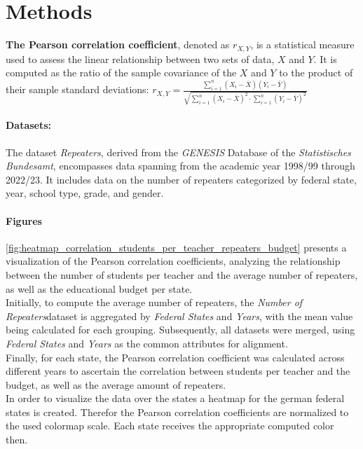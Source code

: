 \section*{Methods}


\textbf{The Pearson correlation coefficient}, denoted as $r_{X,Y}$, is a statistical measure used to assess the linear relationship between two sets of data, $X$ and $Y$. It is computed as the ratio of the sample covariance of the $X$ and $Y$ to the product of their sample standard deviations:
$r_{X,Y} = \frac{\sum_{i=1}^n (X_i - \overline{X}) (Y_i - \overline{Y})}{\sqrt{\sum_{i=1}^n(X_i-\overline{X})^2 \cdot \sum_{i=1}^n(Y_i-\overline{Y})^2}}$


\paragraph{Datasets:}
The dataset \textit{Repeaters}, derived from the \textit{GENESIS} Database of the \textit{Statistisches Bundesamt}, encompasses data spanning from the academic year 1998/99 through 2022/23.  It includes data on the number of repeaters categorized by federal state, year, school type, grade, and gender. 

\paragraph{Figures}
\autoref{fig:heatmap_correlation_students_per_teacher_repeaters_budget} presents a visualization of the Pearson correlation coefficients, analyzing the relationship between the number of students per teacher and the average number of repeaters, as well as the educational budget per state. 
\\
Initially, to compute the average number of repeaters, the \textit{Number of Repeaters}dataset is aggregated by \textit{Federal States} and \textit{Years}, with the mean value being calculated for each grouping. Subsequently, all datasets were merged, using \textit{Federal States} and \textit{Years} as the common attributes for alignment. 
\\
Finally, for each state, the Pearson correlation coefficient was calculated across different years to ascertain the correlation between students per teacher and the budget, as well as the average amount of repeaters.
\\
In order to visualize the data over the states a heatmap for the german federal states is created. Therefor the Pearson correlation coefficients are normalized to the used colormap scale. Each state receives the appropriate computed color then.


